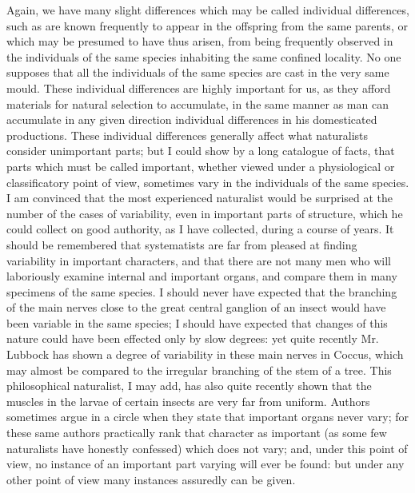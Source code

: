 Again, we have many slight differences which may be called individual differences, such as are known frequently to appear in the offspring from the same parents, or which may be presumed to have thus arisen, from being frequently observed in the individuals of the same species inhabiting the same confined locality. No one supposes that all the individuals of the same species are cast in the very same mould. These individual differences are highly important for us, as they afford materials for natural selection to accumulate, in the same manner as man can accumulate in any given direction individual differences in his domesticated productions. These individual differences generally affect what naturalists consider unimportant parts; but I could show by a long catalogue of facts, that parts which must be called important, whether viewed under a physiological or classificatory point of view, sometimes vary in the individuals of the same species. I am convinced that the most experienced naturalist would be surprised at the number of the cases of variability, even in important parts of structure, which he could collect on good authority, as I have collected, during a course of years. It should be remembered that systematists are far from pleased at finding variability in important characters, and that there are not many men who will laboriously examine internal and important organs, and compare them in many specimens of the same species. I should never have expected that the branching of the main nerves close to the great central ganglion of an insect would have been variable in the same species; I should have expected that changes of this nature could have been effected only by slow degrees: yet quite recently Mr. Lubbock has shown a degree of variability in these main nerves in Coccus, which may almost be compared to the irregular branching of the stem of a tree. This philosophical naturalist, I may add, has also quite recently shown that the muscles in the larvae of certain insects are very far from uniform. Authors sometimes argue in a circle when they state that important organs never vary; for these same authors practically rank that character as important (as some few naturalists have honestly confessed) which does not vary; and, under this point of view, no instance of an important part varying will ever be found: but under any other point of view many instances assuredly can be given.
